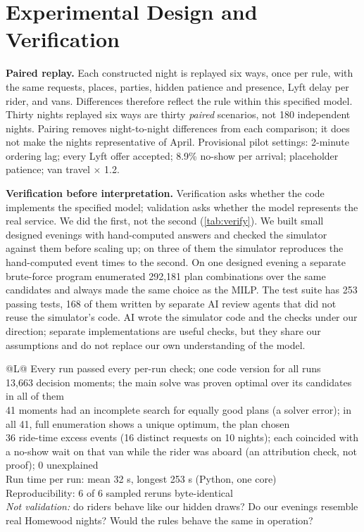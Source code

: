\documentclass{article}
\begin{document}
\section{Experimental Design and Verification}\label{sec:design}

\textbf{Paired replay.} Each constructed night is replayed six ways, once per rule, with the same requests, places, parties, hidden patience and presence, Lyft delay per rider, and vans. Differences therefore reflect the rule within this specified model. Thirty nights replayed six ways are thirty \emph{paired} scenarios, not 180 independent nights. Pairing removes night-to-night differences from each comparison; it does not make the nights representative of April. Provisional pilot settings: 2-minute ordering lag; every Lyft offer accepted; 8.9\% no-show per arrival; placeholder patience; van travel $\times$ 1.2.

\textbf{Verification before interpretation.} Verification asks whether the code implements the specified model; validation asks whether the model represents the real service. We did the first, not the second (\cref{tab:verify}). We built small designed evenings with hand-computed answers and checked the simulator against them before scaling up; on three of them the simulator reproduces the hand-computed event times to the second. On one designed evening a separate brute-force program enumerated 292,181 plan combinations over the same candidates and always made the same choice as the MILP. The test suite has 253 passing tests, 168 of them written by separate AI review agents that did not reuse the simulator's code. AI wrote the simulator code and the checks under our direction; separate implementations are useful checks, but they share our assumptions and do not replace our own understanding of the model.

\begin{table}[t]
\centering\small
\caption{Verification evidence and numerical diagnostics for the pilot batch (180 runs).}\label{tab:verify}
\begin{tabularx}{\columnwidth}{@{}L@{}}
\toprule
Every run passed every per-run check; one code version for all runs\\
13,663 decision moments; the main solve was proven optimal over its candidates in all of them\\
41 moments had an incomplete search for equally good plans (a solver error); in all 41, full enumeration shows a unique optimum, the plan chosen\\
36 ride-time excess events (16 distinct requests on 10 nights); each coincided with a no-show wait on that van while the rider was aboard (an attribution check, not proof); 0 unexplained\\
Run time per run: mean 32 s, longest 253 s (Python, one core)\\
Reproducibility: 6 of 6 sampled reruns byte-identical\\
\midrule
\emph{Not validation:} do riders behave like our hidden draws? Do our evenings resemble real Homewood nights? Would the rules behave the same in operation?\\
\bottomrule
\end{tabularx}
\end{table}
\end{document}
